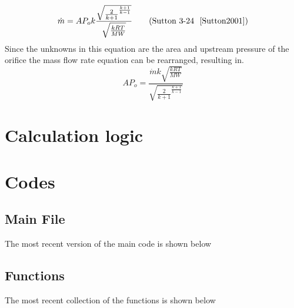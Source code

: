 \documentclass{article}
\begin{document}
        \[
            \dot{m} = AP_{o}k \frac{\sqrt{\frac{2}{k+1}^{\frac{k+1}{k-1}}}}{\sqrt{\frac{kRT}{MW}}}  \tag{Sutton 3-24 ~\cite{Sutton2001}}
        \]
    Since the unknowns in this equation are the area and upstream pressure of the orifice the mass flow rate equation can be rearranged, resulting in.
        \[
           AP_{o} = \frac{ \dot{m}k\sqrt{\frac{kRT}{MW}}}{\sqrt{\frac{2}{k+1}^{\frac{k+1}{k-1}}}} 
        \]
\section*{Calculation logic}
    \begin{figure}[H]
            \begin{center}
                
            \end{center}
            \end{figure}
\section*{Codes}
    \subsection*{Main File}
        The most recent version of the main code is shown below
            
    \subsection*{Functions}
         The most recent collection of the functions is shown below
            


\end{document}

